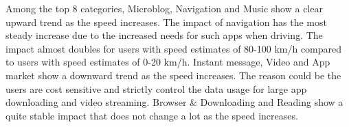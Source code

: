 Among the top 8 categories, Microblog, Navigation and Music show a clear upward trend as the speed increases.
The impact of navigation has the most steady increase due to the increased needs for such apps when driving.
The impact almost doubles for users with speed estimates of 80-100 km/h compared to users with speed estimates of 0-20 km/h.
Instant message, Video and App market show a downward trend as the speed increases.
The reason could be the users are cost sensitive and strictly control the data usage for large app downloading and video streaming.
Browser \& Downloading and Reading show a quite stable impact that does not change a lot as the speed increases.

